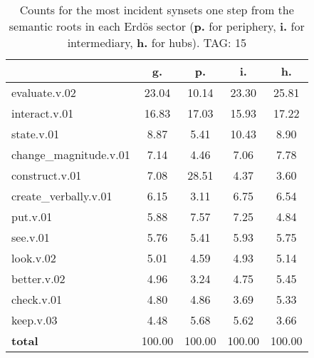 \begin{table}[h!]
\begin{center}
\begin{tabular}{| l | c | c | c | c |}\hline
 & g. & p. & i. & h. \\\hline
evaluate.v.02 & 23.04  & 10.14  & 23.30  & 25.81 \\\hline
interact.v.01 & 16.83  & 17.03  & 15.93  & 17.22 \\\hline
state.v.01 & 8.87  & 5.41  & 10.43  & 8.90 \\\hline
change\_magnitude.v.01 & 7.14  & 4.46  & 7.06  & 7.78 \\\hline
construct.v.01 & 7.08  & 28.51  & 4.37  & 3.60 \\\hline
create\_verbally.v.01 & 6.15  & 3.11  & 6.75  & 6.54 \\\hline
put.v.01 & 5.88  & 7.57  & 7.25  & 4.84 \\\hline
see.v.01 & 5.76  & 5.41  & 5.93  & 5.75 \\\hline
look.v.02 & 5.01  & 4.59  & 4.93  & 5.14 \\\hline
better.v.02 & 4.96  & 3.24  & 4.75  & 5.45 \\\hline
check.v.01 & 4.80  & 4.86  & 3.69  & 5.33 \\\hline
keep.v.03 & 4.48  & 5.68  & 5.62  & 3.66 \\\hline
{{\bf total}} & 100.00  & 100.00  & 100.00  & 100.00 \\\hline
\end{tabular}
\caption{Counts for the most incident synsets one step from the semantic roots in each Erd\"os sector ({\bf p.} for periphery, {\bf i.} for intermediary, {\bf h.} for hubs). TAG: 15}
\end{center}
\end{table}